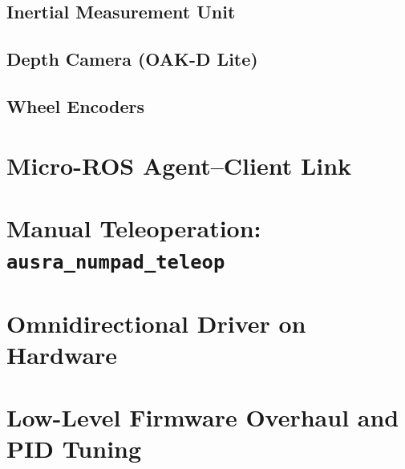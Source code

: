 \subsection{Inertial Measurement Unit}
\label{subsec:hw_imu_test}

\subsection{Depth Camera (OAK-D Lite)}
\label{subsec:hw_camera_test}

\subsection{Wheel Encoders}
\label{subsec:hw_encoder_test}

\section{Micro-ROS Agent--Client Link}
\label{sec:microros_link}

\section{Manual Teleoperation: \texttt{ausra\_numpad\_teleop}}
\label{sec:numpad_teleop}

\section{Omnidirectional Driver on Hardware}
\label{sec:omni_driver_hw}

\section{Low-Level Firmware Overhaul and PID Tuning}
\label{sec:firmware_pid_tuning}

